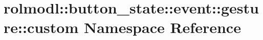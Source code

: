 \hypertarget{namespacerolmodl_1_1button__state_1_1event_1_1gesture_1_1custom}{}\section{rolmodl\+::button\+\_\+state\+::event\+::gesture\+::custom Namespace Reference}
\label{namespacerolmodl_1_1button__state_1_1event_1_1gesture_1_1custom}

